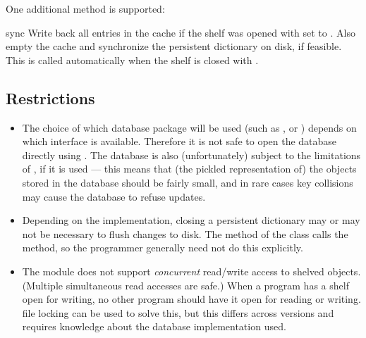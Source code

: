 One additional method is supported:
\begin{methoddesc}[Shelf]{sync}{}
Write back all entries in the cache if the shelf was opened with
 set to . Also empty the cache and synchronize
the persistent dictionary on disk, if feasible.  This is called automatically
when the shelf is closed with .
\end{methoddesc}

\subsection{Restrictions}

\begin{itemize}

\item
The choice of which database package will be used
(such as ,  or ) depends on
which interface is available.  Therefore it is not safe to open the database
directly using .  The database is also (unfortunately) subject
to the limitations of , if it is used --- this means
that (the pickled representation of) the objects stored in the
database should be fairly small, and in rare cases key collisions may
cause the database to refuse updates.

\item
Depending on the implementation, closing a persistent dictionary may
or may not be necessary to flush changes to disk.  The 
method of the  class calls the  method, so the
programmer generally need not do this explicitly.

\item
The  module does not support \emph{concurrent} read/write
access to shelved objects.  (Multiple simultaneous read accesses are
safe.)  When a program has a shelf open for writing, no other program
should have it open for reading or writing.  \UNIX{} file locking can
be used to solve this, but this differs across \UNIX{} versions and
requires knowledge about the database implementation used.

\end{itemize}

